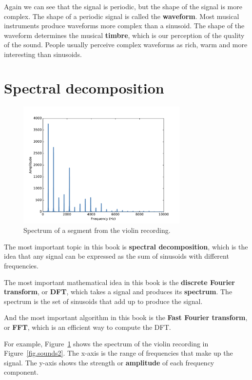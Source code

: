 \documentclass[12pt]{book}
\begin{document}

Again we can see that the signal is periodic, but the shape of the
signal is more complex.  The shape of a periodic signal is called
the {\bf waveform}.  Most musical instruments produce waveforms more
complex than a sinusoid.  The shape of the waveform determines the
musical {\bf timbre}, which is our perception of the quality of the
sound.  People usually perceive complex waveforms as rich, warm and
more interesting than sinusoids.


\section{Spectral decomposition}

\begin{figure}
\centerline{\includegraphics[height=2.5in]{figs/sounds3.pdf}}
\caption{Spectrum of a segment from the violin recording.}
\label{fig.sounds3}
\end{figure}

The most important topic in this book is {\bf spectral decomposition},
which is the idea that any signal can be expressed as the sum of
sinusoids with different frequencies.

The most important mathematical idea in this book is the {\bf discrete
  Fourier transform}, or {\bf DFT}, which takes a signal and produces
its {\bf spectrum}.  The spectrum is the set of sinusoids that add up to
produce the signal.

And the most important algorithm in this book is the {\bf Fast
Fourier transform}, or {\bf FFT}, which is an efficient way to
compute the DFT.

For example, Figure~\ref{fig.sounds3} shows the spectrum of the violin
recording in Figure~\ref{fig.sounds2}.  The x-axis is the range of
frequencies that make up the signal.  The y-axis shows the strength
or {\bf amplitude} of each frequency component.
\end{document}
